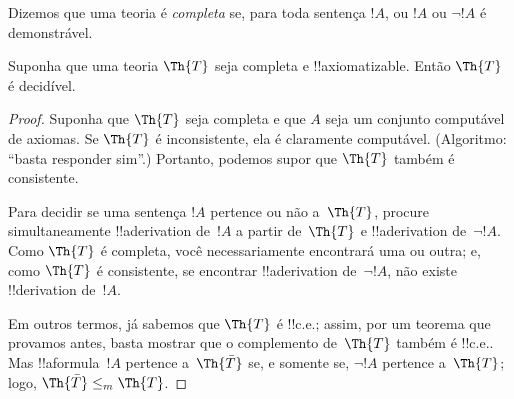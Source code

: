 \documentclass[../../../include/open-logic-section]{subfiles}
\begin{document}


Dizemos que uma teoria é {\em completa} se, para toda sentença $!A$,
ou $!A$ ou $\lnot !A$ é demonstrável.

\begin{lem}
Suponha que uma teoria $\Th{T}$ seja completa e !!{axiomatizable}.
Então $\Th{T}$ é decidível.
\end{lem}

\begin{proof}
Suponha que $\Th{T}$ seja completa e que $A$ seja um conjunto
computável de axiomas. Se $\Th{T}$ é inconsistente, ela é claramente
computável. (Algoritmo: ``basta responder sim''.) Portanto, podemos
supor que $\Th{T}$ também é consistente.

Para decidir se uma sentença $!A$ pertence ou não a~$\Th{T}$, procure
simultaneamente !!a{derivation} de~$!A$ a partir de~$\Th{T}$ e
!!a{derivation} de~$\lnot !A$. Como $\Th{T}$ é completa, você
necessariamente encontrará uma ou outra; e, como $\Th{T}$ é
consistente, se encontrar !!a{derivation} de~$\lnot !A$, não existe
!!{derivation} de~$!A$.

Em outros termos, já sabemos que $\Th{T}$ é !!{c.e.}; assim, por um
teorema que provamos antes, basta mostrar que o complemento de~$\Th{T}$
também é !!{c.e.}. Mas !!a{formula}~$!A$ pertence a~$\Th{\bar T}$ se,
e somente se, $\lnot !A$ pertence a~$\Th{T}$; logo,
$\Th{\bar T} \leq_m \Th{T}$.
\end{proof}
\end{document}
